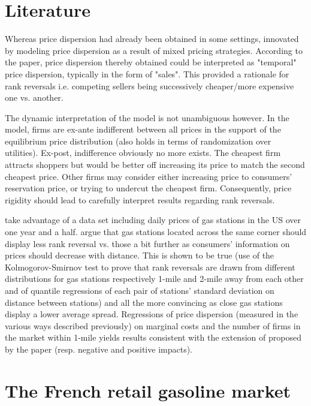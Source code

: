 \documentclass[11pt]{article}
\begin{document}
\section{Literature}

Whereas price dispersion had already been obtained in some settings, \cite{VAR80} innovated by modeling price dispersion as a result of mixed pricing strategies. According to the paper, price dispersion thereby obtained could be interpreted as "temporal" price dispersion, typically in the form of "sales". This provided a rationale for rank reversals i.e. competing sellers being successively cheaper/more expensive one vs. another.

The dynamic interpretation of the model is not unambiguous however. In the model, firms are ex-ante indifferent between all prices in the support of the equilibrium price distribution (also holds in terms of randomization over utilities). Ex-post, indifference obviously no more exists. The cheapest firm attracts shoppers but would be better off increasing its price to match the second cheapest price. Other firms may consider either increasing price to consumers' reservation price, or trying to undercut the cheapest firm. Consequently, price rigidity should lead to carefully interpret results regarding rank reversals.

\cite{TAP11} take advantage of a data set including daily prices of gas stations in the US over one year and a half. \cite{TAP11} argue that gas stations located across the same corner should display less rank reversal vs. those a bit further as consumers' information on prices should decrease with distance. This is shown to be true (use of the Kolmogorov-Smirnov test to prove that rank reversals are drawn from different distributions for gas stations respectively 1-mile and 2-mile away from each other and of quantile regressions of each pair of stations' standard deviation on distance between stations) and all the more convincing as close gas stations display a lower average spread. Regressions of price dispersion (measured in the various ways described previously) on marginal costs and the number of firms in the market within 1-mile yields results consistent with the extension of \cite{VAR80} proposed by the paper (resp. negative and positive impacts).

\section{The French retail gasoline market}
\end{document}

